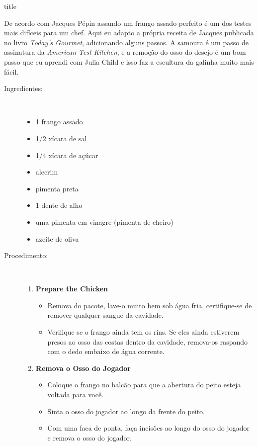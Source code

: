 \documentclass [11pt, letterpaper] {article}
\begin{document}
 {title}

De acordo com Jacques P\'epin assando um frango assado perfeito é um dos testes mais difíceis para um chef. Aqui eu adapto a própria receita de Jacques publicada no livro {\it Today's Gourmet}, adicionando alguns passos. A samoura é um passo de assinatura da {\it American Test Kitchen}, e a remoção do osso do desejo é um bom passo que eu aprendi com Julia Child e isso faz a escultura da galinha muito mais fácil.
 
\begin {description}

\item [Ingredientes:] \ \\
\begin {itemize}
\item 1 frango assado
\item 1/2 xícara de sal
\item 1/4 xícara de açúcar
\item alecrim
\item pimenta preta
\item 1 dente de alho
\item uma pimenta em vinagre (pimenta de cheiro)
\item azeite de oliva
\end {itemize}

\item [Procedimento:] \ \\

\begin {enumerate}
\item {\bf Prepare the Chicken}
\begin {itemize}
\item Remova do pacote, lave-o muito bem sob água fria, certifique-se de remover qualquer sangue da cavidade.
\item Verifique se o frango ainda tem os rins. Se eles ainda estiverem presos ao osso das costas dentro da cavidade, remova-os raspando com o dedo embaixo de água corrente.
\end {itemize}

\item {\bf Remova o Osso do Jogador}
\begin {itemize}
\item Coloque o frango no balcão para que a abertura do peito esteja voltada para você.
\item Sinta o osso do jogador ao longo da frente do peito.
\item Com uma faca de ponta, faça incisões ao longo do osso do jogador e remova o osso do jogador.
\end {itemize}



\end{enumerate}
\end{description}
\end{document}
